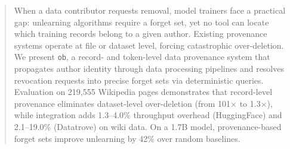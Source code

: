 \begin{abstract}
	When a data contributor requests removal, model trainers face a practical gap: unlearning algorithms require a forget set, yet no tool can locate which training records belong to a given author. Existing provenance systems operate at file or dataset level, forcing catastrophic over-deletion. We present \texttt{ob}, a record- and token-level data provenance system that propagates author identity through data processing pipelines and resolves revocation requests into precise forget sets via deterministic queries. Evaluation on 219,555 Wikipedia pages demonstrates that record-level provenance eliminates dataset-level over-deletion (from 101$\times$ to 1.3$\times$), while integration adds 1.3--4.0\% throughput overhead (HuggingFace) and 2.1--19.0\% (Datatrove) on wiki data. On a 1.7B model, provenance-based forget sets improve unlearning by 42\% over random baselines.
\end{abstract}

